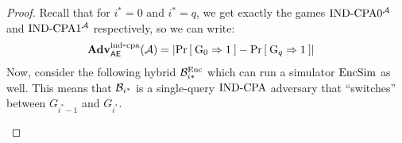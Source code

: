 \begin{proof}
Recall that for $i^* = 0$ and $i^*=q$, we get exactly the games $\textnormal{IND-CPA}0^{\mathcal A}$ and $\textnormal{IND-CPA}1^{{\mathcal A}}$ respectively, so we can write:
\begin{align*}
\AdvINDCPA{\AEnc}{\advA} 
  &= \left|\Prob{\G_0\Rightarrow1} - \Prob{\G_q\Rightarrow1}\right|%
\end{align*}
Now, consider the following hybrid ${\mathcal B}_{i*}^{\textnormal{Enc}}$ which can run a simulator $\textnormal{EncSim}$ as well. This means that ${\mathcal B}_{i^*}$ is a single-query $\textnormal{IND-CPA}$ adversary that ``switches'' between $G_{i^*-1}$ and $G_{i^*}$.
\begin{center}
\end{center}


\end{proof}
